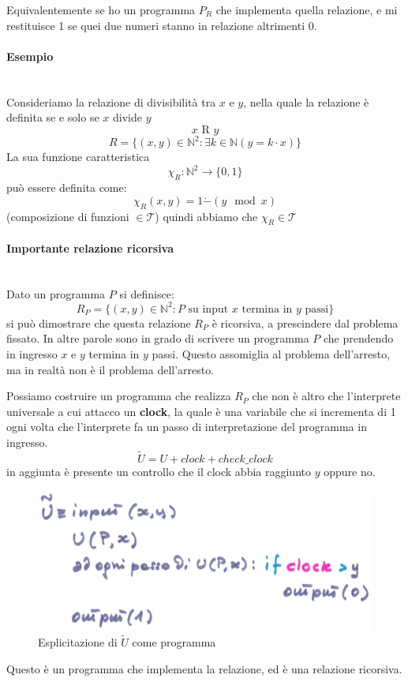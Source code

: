 \documentclass{article}
\begin{document}
Equivalentemente se ho un programma $P_R$ che implementa quella relazione, e mi restituisce
1 se quei due numeri stanno in relazione altrimenti 0.
\paragraph{Esempio}\mbox{}\\
Consideriamo la relazione di divisibilità tra $x$ e $y$, nella quale la relazione
è definita se e solo se $x$ divide $y$
$$x\text{ R }y$$
$$R=\{(x,y)\in\mathbb{N}^2:\exists k\in\mathbb{N}(y=k\cdot x)\}$$
La sua funzione caratteristica
$$\chi_R:\mathbb{N}^2\rightarrow \{0,1\}$$
può essere definita come:
$$\chi_R(x,y)=1\dot{-}(y\mod x)$$
(composizione di funzioni $\in\mathcal{T}$)
quindi abbiamo che $\chi_R\in\mathcal{T}$

\paragraph{Importante relazione ricorsiva}\mbox{}\\
Dato un programma $P$ si definisce:
$$R_P=\{(x,y)\in\mathbb{N}^2:P\text{ su input }x\text{ termina in }y\text{ passi}\}$$
si può dimostrare che questa relazione $R_P$ è ricorsiva, a prescindere dal
problema fissato. In altre parole sono in grado di scrivere un programma $P$ che prendendo
in ingresso $x$ e $y$ termina in $y$ passi. Questo assomiglia al problema dell'arresto,
ma in realtà non è il problema dell'arresto.

Possiamo costruire un programma che realizza $R_P$ che non è altro che l'interprete universale
a cui attacco un \textbf{clock}, la quale è una variabile che si incrementa di 1
ogni volta che l'interprete fa un passo di interpretazione del programma in ingresso.
$$\tilde{U}=U+clock+check\_clock$$
in aggiunta è presente un controllo che il clock abbia raggiunto $y$ oppure no.

\begin{figure}[H]
    \centering
    \includegraphics[scale=0.5]{images/tilde_U.png}
    \caption{Esplicitazione di $\tilde{U}$ come programma}
\end{figure}
Questo è un programma che implementa la relazione, ed è una relazione ricorsiva.
\end{document}
